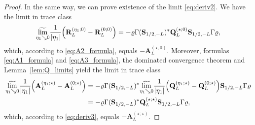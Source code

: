 \documentclass[oneside,final,11pt]{amsart}
\theoremstyle{definition}
\newcommand{\mylim}[1]{\underset{#1}{\wt{\mathrm{lim}}}}
\newcommand{\1}[1]{\mathbf{1}_{#1}}
\newcommand{\wt}{\widetilde}
\newcommand{\fT}{\mathbf{S}}
\newcommand{\fQ}{\mathbf{Q}}
\newcommand{\fA}{\mathbf{A}}
\newcommand{\fR}{\mathbf{R}}
\numberwithin{equation}{section}
\begin{document}
\begin{proof}
In the same way, we can prove existence of the limit \eqref{eq:deriv2}. We have the limit in trace class
\begin{equation}
\mylim{\eta_1 \searrow 0} \frac{1}{|\eta_1|} \Bigl(  \fR_L^{(\eta_1; 0)} -   \fR_L^{(0; 0)}\Bigr) = - \varrho \Gamma (\fT_{1/2,-L})^* \fQ_L^{(\star; 0)} \fT_{1/2,-L} \Gamma \varrho,
\end{equation}
which, according to \eqref{eq:A2_formula}, equals $-\fA_L^{(\star; 0)}$. Moreover, formulas \eqref{eq:A1_formula} and \eqref{eq:A3_formula}, the dominated convergence theorem and Lemma~\ref{lem:Q_limits} yield the limit in trace class
\begin{align}
\mylim{\eta_1 \searrow 0} \frac{1}{|\eta_1|} \Bigl( \fA_L^{(\eta_1; \star)} -  \fA_L^{(0; \star)}\Bigr) &= - \varrho \Gamma (\fT_{1/2,-L})^* \mylim{\eta_1 \searrow 0} \frac{1}{|\eta_1|} \Bigl( \fQ_L^{(\eta_1; \star)} - \fQ_L^{(0; \star)} \Bigr) \fT_{1/2,-L} \Gamma \varrho\\
&= - \varrho \Gamma (\fT_{1/2,-L})^* \fQ_L^{(\star; \star)} \fT_{1/2,-L} \Gamma \varrho,
\end{align}
which, according to \eqref{eq:deriv3}, equals $- \fA_L^{(\star; \star)}$.
\end{proof}
\end{document}
